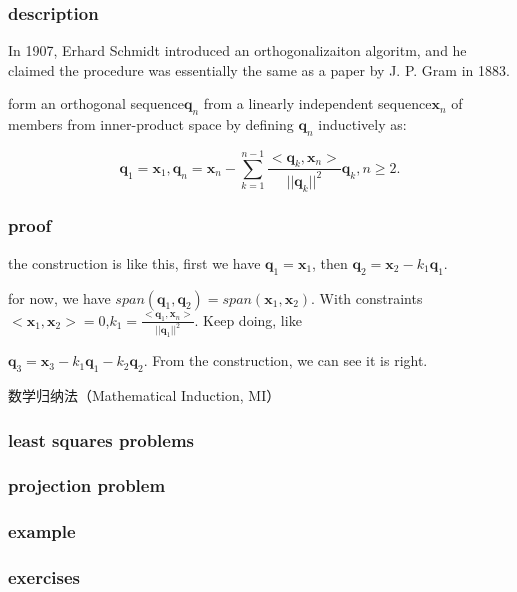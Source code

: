 \documentclass[UTF8]{../../09-Mathematics}
\begin{document}
\subsubsection{description}

In 1907, Erhard Schmidt introduced an orthogonalizaiton algoritm, and he claimed the procedure was essentially the same as a paper by J. P. Gram in 1883.

form an orthogonal sequence${\boldsymbol{q}_n}$ from  a linearly independent sequence${\boldsymbol{x}_n}$ of members from inner-product space by defining ${\boldsymbol{q}_n}$ inductively as:

$$
\boldsymbol{q}_1 = \boldsymbol{x}_1,
\boldsymbol{q}_n = \boldsymbol{x}_n - \sum_{k=1}^{n-1}\frac{<\boldsymbol{q}_k,\boldsymbol{x}_n>}{||\boldsymbol{q}_k||^2}\boldsymbol {q}_k, n\geqslant2.
$$


\subsubsection{proof}

the construction is like this, first we have 
$\boldsymbol{q}_1 = \boldsymbol{x}_1$, then $\boldsymbol{q}_2 = \boldsymbol{x}_2 - k_1 \boldsymbol{q}_1$.

for now, we have 
$span(\boldsymbol{q}_1,\boldsymbol{q}_2) =span(\boldsymbol{x}_1,\boldsymbol{x}_2) $. With constraints $<\boldsymbol{x}_1,\boldsymbol{x}_2>=0$,$k_1 = \frac{<\boldsymbol{q}_1,\boldsymbol{x}_n>}{||\boldsymbol{q}_1||^2}$. Keep doing, like 

$\boldsymbol{q}_3 = \boldsymbol{x}_3 - k_1 \boldsymbol{q}_1- k_2 \boldsymbol{q}_2$. From the construction, we can see it is right.


数学归纳法（Mathematical Induction, MI）


\subsubsection{least squares problems}

\subsubsection{projection problem}

\subsubsection{example}

\subsubsection{exercises}
\end{document}

